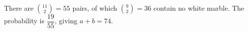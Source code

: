 There are $\binom{11}{2}=55$ pairs, of which $\binom92=36$ contain no white marble. The probability is $\dfrac{19}{55}$, giving $a+b=\boxed{74}$.
